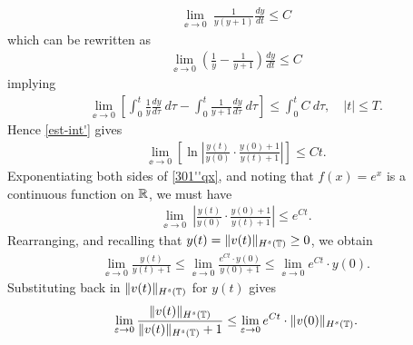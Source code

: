 \begin{equation*}
	\begin{split}
		\lim_{\ee \to 0} \ \frac{1}{y(y+1)} \frac{dy}{dt} \le C	
	\end{split}
\end{equation*}
which can be rewritten as
\begin{equation*}
	\begin{split}
		\lim_{\ee \to 0}
		\left( \frac{1}{y} - \frac{1}{y+1} \right)\frac{dy}{dt} \le C
	\end{split}
\end{equation*}
implying
\begin{equation}
	\label{est-int'}
	\begin{split}
		\lim_{\ee \to 0} \left [
\int_0^t \frac{1}{y} \frac{dy}{d \tau} \ d \tau
		- \int_0^t \frac{1}{y+1} \frac{dy}{d \tau} \ d \tau \right ]
		\le \int_0^t C \ d \tau, \quad |t| \le T.
	\end{split}
\end{equation}
Hence \eqref{est-int'} gives 
\begin{equation}
	\begin{split}
	\lim_{\ee \to 0} 
	\left [ \ln \left | \frac{y(t)}{y(0)}
	\cdot \frac{y(0) + 1}{y(t) + 1} \right | \right ] \le C t.
		\label{301''qx}
	\end{split}
\end{equation}
Exponentiating both sides of \eqref{301''qx}, and noting that $f(x) = e^x$
is a continuous function on $\mathbb{R}$, we must have
\begin{equation*}
	\begin{split}
		\lim_{\ee \to 0}  \
		\left | \frac{y(t)}{y(0)} \cdot \frac{y(0) + 1}{y(t) + 1} \right | \le e^{C t}.
	\end{split}
\end{equation*}
Rearranging, and recalling that $y(t) = \|v(t)\|_{H^s(\mathbb{T})} \ge 0$, we obtain
\begin{equation*}
	\begin{split}
		\lim_{\ee \to 0} \frac{y(t)}{y(t) + 1}
		\le \lim_{\ee \to 0} \frac{e^{C t} \cdot y(0)}{y(0) + 1} \le
		\lim_{\ee \to 0} e^{C t} \cdot y(0).
	\end{split}
\end{equation*}
Substituting back in $\|v(t)\|_{H^s(\mathbb{T})}$ for $y(t)$ gives
\begin{equation}
	\begin{split}
		\lim_{\varepsilon \to 0}	\frac{\|v(t)\|_{H^s(\mathbb{T})}}{\|v(t)\|_{H^s(\mathbb{T})} + 1}  \le
		\lim_{\varepsilon \to 0} e^{C t} \cdot \|v(0)\|_{H^s(\mathbb{T})}.
		\label{303'qx}
	\end{split}
\end{equation}
